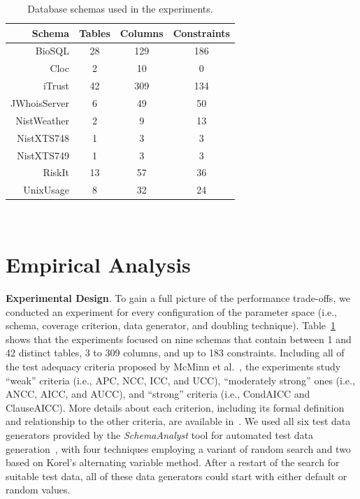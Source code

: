 
\begin{table}[t]
  \centering

  {\footnotesize
  \begin{tabular}{r | c c c}
                           Schema & Tables & Columns & Constraints \\ \hline
    BioSQL                        & 28     & 129     & 186 \\
    Cloc                          & 2      & 10      & 0 \\
    iTrust                        & 42     & 309     & 134 \\
    JWhoisServer                  & 6      & 49      & 50 \\
    NistWeather                   & 2      & 9       & 13 \\
    NistXTS748                    & 1      & 3       & 3 \\
    NistXTS749                    & 1      & 3       & 3 \\
    RiskIt                        & 13     & 57      & 36 \\
    UnixUsage                     & 8      & 32      & 24
\end{tabular}}

  \vspace*{-.05in}
  \caption{Database schemas used in the experiments.}~\label{tab:schemas}
  \vspace*{-.25in}

\end{table}

\vspace{-.05in}
\section{Empirical Analysis}
\vspace{-.05in}

\textbf{Experimental Design}. To gain a full picture of the performance trade-offs, we conducted an experiment for every
configuration of the parameter space (i.e., schema, coverage criterion, data generator, and doubling technique).
Table~\ref{tab:schemas} shows that the experiments focused on nine schemas that contain between 1 and 42 distinct
tables, 3 to 309 columns, and up to 183 constraints. Including all of the test adequacy criteria proposed by McMinn et
al.~\cite{mcminn2015}, the experiments study ``weak'' criteria (i.e., APC, NCC, ICC, and UCC), ``moderately strong''
ones (i.e., ANCC, AICC, and AUCC), and ``strong'' criteria (i.e., CondAICC and ClauseAICC). More details about each
criterion, including its formal definition and relationship to the other criteria, are available in~\cite{mcminn2015}. We
used all six test data generators provided by the {\em SchemaAnalyst} tool for automated test data
generation~\cite{kapfhammer2013}, with four techniques employing a variant of random search and two based on Korel's
alternating variable method. After a restart of the search for suitable test data, all of these data generators could
start with either default or random values.

